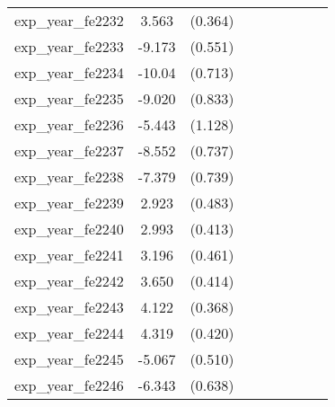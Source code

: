{\begin{tabular}{l*{4}{cc}}
exp\_year\_fe2232&    3.563\sym{***}&  (0.364)&                  &         &                  &         &                  &         \\
exp\_year\_fe2233&   -9.173\sym{***}&  (0.551)&                  &         &                  &         &                  &         \\
exp\_year\_fe2234&   -10.04\sym{***}&  (0.713)&                  &         &                  &         &                  &         \\
exp\_year\_fe2235&   -9.020\sym{***}&  (0.833)&                  &         &                  &         &                  &         \\
exp\_year\_fe2236&   -5.443\sym{***}&  (1.128)&                  &         &                  &         &                  &         \\
exp\_year\_fe2237&   -8.552\sym{***}&  (0.737)&                  &         &                  &         &                  &         \\
exp\_year\_fe2238&   -7.379\sym{***}&  (0.739)&                  &         &                  &         &                  &         \\
exp\_year\_fe2239&    2.923\sym{***}&  (0.483)&                  &         &                  &         &                  &         \\
exp\_year\_fe2240&    2.993\sym{***}&  (0.413)&                  &         &                  &         &                  &         \\
exp\_year\_fe2241&    3.196\sym{***}&  (0.461)&                  &         &                  &         &                  &         \\
exp\_year\_fe2242&    3.650\sym{***}&  (0.414)&                  &         &                  &         &                  &         \\
exp\_year\_fe2243&    4.122\sym{***}&  (0.368)&                  &         &                  &         &                  &         \\
exp\_year\_fe2244&    4.319\sym{***}&  (0.420)&                  &         &                  &         &                  &         \\
exp\_year\_fe2245&   -5.067\sym{***}&  (0.510)&                  &         &                  &         &                  &         \\
exp\_year\_fe2246&   -6.343\sym{***}&  (0.638)&                  &         &                  &         &                  &         \\

\end{tabular}}
